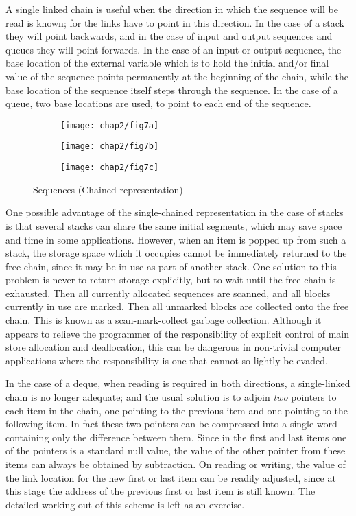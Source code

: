 A single linked chain is useful when the direction in which the sequence will be read is known; for the links have to point in this direction. In the case of a stack they will point backwards, and in the case of input and output sequences and queues they will point forwards. In the case of an input or output sequence, the base location of the external variable which is to hold the initial and$/$or final value of the sequence points permanently at the beginning of the chain, while the base location of the sequence itself steps through the sequence. In the case of a queue, two base locations are used, to point to each end of the sequence.

\begin{figure}[h]
	\centering
	\begin{subfigure}[b]{0.3\textwidth}
		\centering
		\texttt{[image: chap2/fig7a]}
		\caption{}
	\end{subfigure}	
	\begin{subfigure}[b]{0.3\textwidth}
		\centering
		\texttt{[image: chap2/fig7b]}
		\caption{}
	\end{subfigure}	
	\begin{subfigure}[b]{0.3\textwidth}
		\centering
		\texttt{[image: chap2/fig7c]}
		\caption{}
	\end{subfigure}
	\caption{Sequences (Chained representation)}
\end{figure}

One possible advantage of the single-chained representation in the case of stacks is that several stacks can share the same initial segments, which may save space and time in some applications. However, when an item is popped up from such a stack, the storage space which it occupies cannot be immediately returned to the free chain, since it may be in use as part of another stack. One solution to this problem is never to return storage explicitly, but to wait until the free chain is exhausted. Then all currently allocated sequences are scanned, and all blocks currently in use are marked. Then all unmarked blocks are collected onto the free chain. This is known as a scan-mark-collect garbage collection. Although it appears to relieve the programmer of the responsibility of explicit control of main store allocation and deallocation, this can be dangerous in non-trivial computer applications where the responsibility is one that cannot so lightly be evaded.

In the case of a deque, when reading is required in both directions, a single-linked chain is no longer adequate; and the usual solution is to adjoin \textit{two} pointers to each item in the chain, one pointing to the previous item and one pointing to the following item. In fact these two pointers can be compressed into a single word containing only the difference between them. Since in the first and last items one of the pointers is a standard null value, the value of the other pointer from these items can always be obtained by subtraction. On reading or writing, the value of the link location for the new first or last item can be readily adjusted, since at this stage the address of the previous first or last item is still known. The detailed working out of this scheme is left as an exercise.

